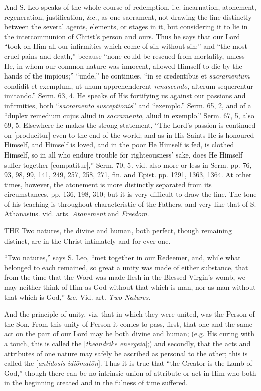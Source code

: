 And S. Leo speaks of the whole course of
redemption, i.e. incarnation, atonement, regeneration, justification,
\&c., as one sacrament, not drawing the line distinctly between the
several agents, elements, or stages in it, but considering it to lie
in the intercommunion of Christ's person and ours. Thus he says that
our Lord ``took on Him all our infirmities which come of sin without
sin;'' and ``the most cruel pains and death,'' because ``none could be
rescued from mortality, unless He, in whom our common nature was
innocent, allowed Himself to die by the hands of the impious;'' ``unde,''
he continues, ``in se credentibus et \emph{sacramentum} condidit et
exemplum, ut unum apprehenderent \emph{renascendo}, alterum
sequerentur imitando.'' Serm. 63, 4. He speaks of His fortifying us
against our passions and infirmities, both ``\emph{sacramento susceptionis}''
and ``exemplo.'' Serm. 65, 2, and of a ``duplex remedium cujus aliud in
\emph{sacramento}, aliud in exemplo.'' Serm. 67, 5, also 69, 5.
Elsewhere he makes the strong statement, ``The Lord's passion is
continued on [producitur] even to the end of the world; and as in His
Saints He is honoured Himself, and Himself is loved, and in the poor
He Himself is fed, is clothed Himself, so in all who endure trouble
for righteousness' sake, does He Himself suffer together [compatitur],''
Serm. 70, 5. vid. also more or less in Serm. pp. 76, 93, 98, 99, 141,
249, 257, 258, 271, fin. and Epist. pp. 1291, 1363, 1364. At other
times, however, the atonement is more distinctly separated from its
circumstances, pp. 136, 198, 310; but it is very difficult to draw the
line. The tone of his teaching is throughout characteristic of the
Fathers, and very like that of S. Athanasius. vid. arts. \emph{Atonement}
and \emph{Freedom}.


THE
Two natures, the divine and human, both perfect, though remaining
distinct, are in the Christ intimately and for ever one.

``Two natures,'' says S. Leo, ``met together in our
Redeemer, and, while what belonged to each remained, so great a unity
was made of either substance, that from the time that the Word was
made flesh in the Blessed Virgin's womb, we may neither think of Him
as God without that which is man, nor as man without that which is
God,'' \&c. Vid. art. \emph{Two Natures}.

And the principle of unity, viz. that in which
they were united, was the Person of the Son. From this unity of
Person it comes to pass, first, that one and the same act on the part
of our Lord may be both divine and human; (e.g. His curing with a
touch, this is called the [\emph{theandrik\={e} energeia}];) and
secondly, that the acts and attributes of one nature may safely be
ascribed as personal to the other; this is called the [\emph{antidosis
idi\={o}mat\={o}n}]. Thus it is true that ``the Creator is the
Lamb of God,'' though there can be no intrinsic union of attribute or
act in Him who both in the beginning created and in the fulness of
time suffered.

